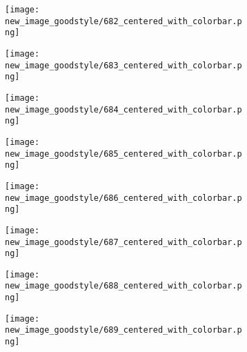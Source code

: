 \documentclass[a4paper,12pt]{article}
\begin{document}
\begin{figure}[H]
  \begin{subfigure}{0.11\textwidth}
    \texttt{[image: new\_image\_goodstyle/682\_centered\_with\_colorbar.png]}
  \end{subfigure}
  \hfill
  \begin{subfigure}{0.11\textwidth}
    \texttt{[image: new\_image\_goodstyle/683\_centered\_with\_colorbar.png]}
  \end{subfigure}
  \hfill
  \begin{subfigure}{0.11\textwidth}
    \texttt{[image: new\_image\_goodstyle/684\_centered\_with\_colorbar.png]}
  \end{subfigure}
  \hfill
  \begin{subfigure}{0.11\textwidth}
    \texttt{[image: new\_image\_goodstyle/685\_centered\_with\_colorbar.png]}
  \end{subfigure}
  \hfill
  \begin{subfigure}{0.11\textwidth}
    \texttt{[image: new\_image\_goodstyle/686\_centered\_with\_colorbar.png]}
  \end{subfigure}
  \hfill
  \begin{subfigure}{0.11\textwidth}
    \texttt{[image: new\_image\_goodstyle/687\_centered\_with\_colorbar.png]}
  \end{subfigure}
  \hfill
  \begin{subfigure}{0.11\textwidth}
    \texttt{[image: new\_image\_goodstyle/688\_centered\_with\_colorbar.png]}
  \end{subfigure}
  \hfill
  \begin{subfigure}{0.11\textwidth}
    \texttt{[image: new\_image\_goodstyle/689\_centered\_with\_colorbar.png]}
  \end{subfigure}
  \hfill
\end{figure}
\end{document}
